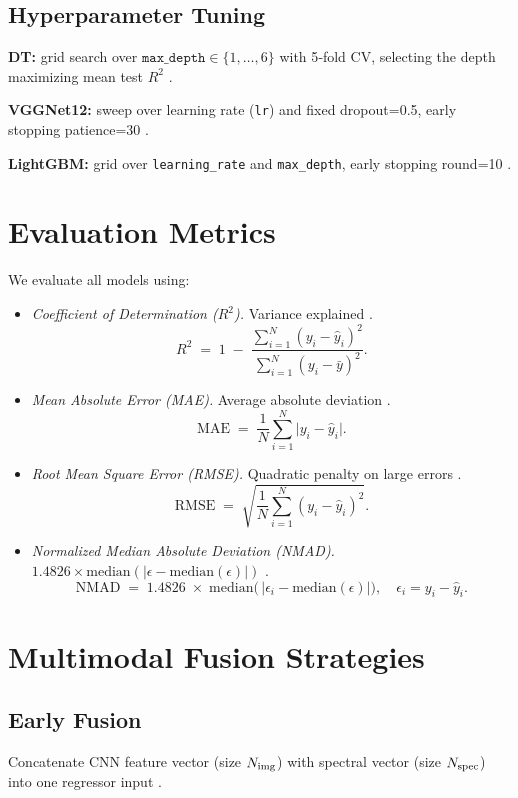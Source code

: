 \documentclass[english,bachelor,oneside]{ctufit-thesis}
\begin{document}
\subsection{Hyperparameter Tuning}
\textbf{DT:} grid search over $\texttt{max\_depth}\in\{1,\dots,6\}$ with 5‐fold CV, selecting the depth maximizing mean test $R^2$ \cite{Hastie2009}.  

\textbf{VGGNet12:} sweep over learning rate (\texttt{lr}) and fixed dropout=0.5, early stopping patience=30 \cite{Smith2017,Prechelt1998}.  

\textbf{LightGBM:} grid over \texttt{learning\_rate} and \texttt{max\_depth}, early stopping round=10 \cite{Friedman2001}.

\section{Evaluation Metrics}
We evaluate all models using:
\begin{itemize}
  \item \textit{Coefficient of Determination ($R^2$).} Variance explained \cite{Hastie2009}.\\
  \[
    R^2 \;=\; 1 \;-\; \frac{\sum_{i=1}^N (y_i - \hat y_i)^2}{\sum_{i=1}^N (y_i - \bar y)^2}.
  \]
  \item \textit{Mean Absolute Error (MAE).} Average absolute deviation \cite{Hastie2009}.\\
  \[
    \mathrm{MAE} \;=\; \frac{1}{N} \sum_{i=1}^N \bigl|y_i - \hat y_i\bigr|.
  \]
  \item \textit{Root Mean Square Error (RMSE).} Quadratic penalty on large errors \cite{Hastie2009}.\\
  \[
    \mathrm{RMSE} \;=\; \sqrt{\frac{1}{N} \sum_{i=1}^N (y_i - \hat y_i)^2}.
  \]
  \item \textit{Normalized Median Absolute Deviation (NMAD).} $1.4826\times\mathrm{median}(|\epsilon-\mathrm{median}(\epsilon)|)$ \cite{Rousseeuw1993}.\\
  \[
    \mathrm{NMAD} \;=\; 1.4826 \;\times\; \mathrm{median}\!\bigl(\,\lvert \epsilon_i - \mathrm{median}(\epsilon)\rvert\bigr),
    \quad \epsilon_i = y_i - \hat y_i.
  \]
\end{itemize}


\section{Multimodal Fusion Strategies}
\subsection{Early Fusion}
Concatenate CNN feature vector (size $N_{\rm img}$) with spectral vector (size $N_{\rm spec}$) into one regressor input \cite{Baltrusaitis2018}.
\end{document}
